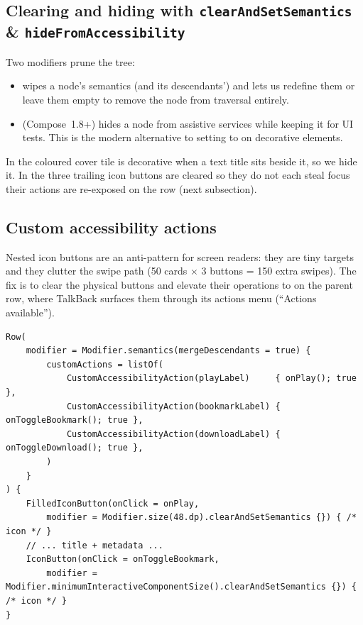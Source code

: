 \subsection{Clearing and hiding with \texttt{clearAndSetSemantics} \& \texttt{hideFromAccessibility}}

Two modifiers prune the tree:

\begin{itemize}[leftmargin=1.4em]
	\item {} wipes a node's semantics (and its descendants') and lets us
	      redefine them  or leave them empty to remove the node from traversal entirely.
	\item {} (Compose~1.8+) hides a node from assistive services while
	      keeping it for UI tests. This is the modern alternative to setting
	       to  on decorative elements.
\end{itemize}

In  the coloured cover tile is decorative when a text title sits beside it, so we
hide it. In  the three trailing icon buttons are cleared so they do not each
steal focus their actions are re-exposed on the row (next subsection).

\subsection{Custom accessibility actions}

Nested icon buttons are an anti-pattern for screen readers: they are tiny targets and they clutter
the swipe path (50 cards $\times$ 3 buttons = 150 extra swipes). The fix is to clear the
physical buttons and elevate their operations to  on the parent row, where
TalkBack surfaces them through its actions menu (``Actions available'').

\begin{lstlisting}[caption={\texttt{EpisodeRow.kt} --- nested actions promoted to the row's actions menu.},captionpos=b]
Row(
    modifier = Modifier.semantics(mergeDescendants = true) {
        customActions = listOf(
            CustomAccessibilityAction(playLabel)     { onPlay(); true },
            CustomAccessibilityAction(bookmarkLabel) { onToggleBookmark(); true },
            CustomAccessibilityAction(downloadLabel) { onToggleDownload(); true },
        )
    }
) {
    FilledIconButton(onClick = onPlay,
        modifier = Modifier.size(48.dp).clearAndSetSemantics {}) { /* icon */ }
    // ... title + metadata ...
    IconButton(onClick = onToggleBookmark,
        modifier = Modifier.minimumInteractiveComponentSize().clearAndSetSemantics {}) { /* icon */ }
}
\end{lstlisting}

